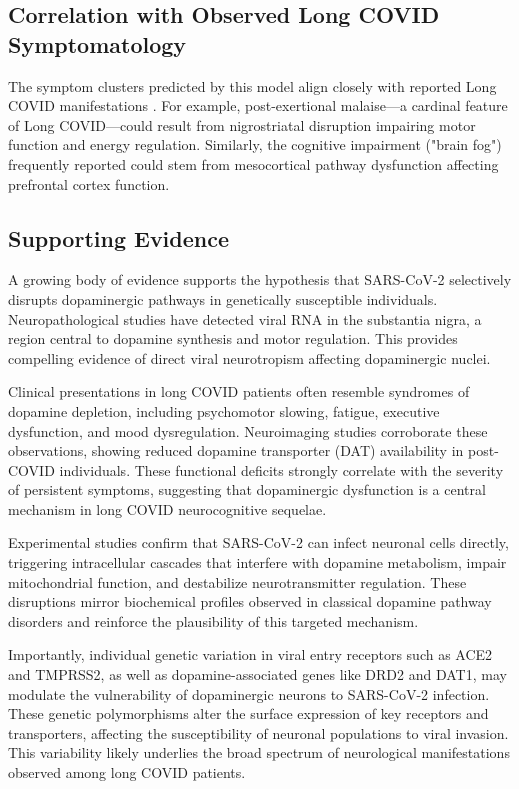 \documentclass[11pt]{article}
\begin{document}
\subsection*{Correlation with Observed Long COVID Symptomatology}
The symptom clusters predicted by this model align closely with reported Long COVID manifestations \citep{graham2021longcovidneuro, davis2021longcovidcohort}. For example, post-exertional malaise—a cardinal feature of Long COVID—could result from nigrostriatal disruption impairing motor function and energy regulation. Similarly, the cognitive impairment ("brain fog") frequently reported could stem from mesocortical pathway dysfunction affecting prefrontal cortex function.

\begin{center}
\section*{Supporting Evidence}
\end{center}

A growing body of evidence supports the hypothesis that SARS-CoV-2 selectively disrupts dopaminergic pathways in genetically susceptible individuals. Neuropathological studies have detected viral RNA in the substantia nigra, a region central to dopamine synthesis and motor regulation. This provides compelling evidence of direct viral neurotropism affecting dopaminergic nuclei.

Clinical presentations in long COVID patients often resemble syndromes of dopamine depletion, including psychomotor slowing, fatigue, executive dysfunction, and mood dysregulation. Neuroimaging studies corroborate these observations, showing reduced dopamine transporter (DAT) availability in post-COVID individuals. These functional deficits strongly correlate with the severity of persistent symptoms, suggesting that dopaminergic dysfunction is a central mechanism in long COVID neurocognitive sequelae.

Experimental studies confirm that SARS-CoV-2 can infect neuronal cells directly, triggering intracellular cascades that interfere with dopamine metabolism, impair mitochondrial function, and destabilize neurotransmitter regulation. These disruptions mirror biochemical profiles observed in classical dopamine pathway disorders and reinforce the plausibility of this targeted mechanism.

Importantly, individual genetic variation in viral entry receptors such as ACE2 and TMPRSS2, as well as dopamine-associated genes like DRD2 and DAT1, may modulate the vulnerability of dopaminergic neurons to SARS-CoV-2 infection. These genetic polymorphisms alter the surface expression of key receptors and transporters, affecting the susceptibility of neuronal populations to viral invasion. This variability likely underlies the broad spectrum of neurological manifestations observed among long COVID patients.
\end{document}
